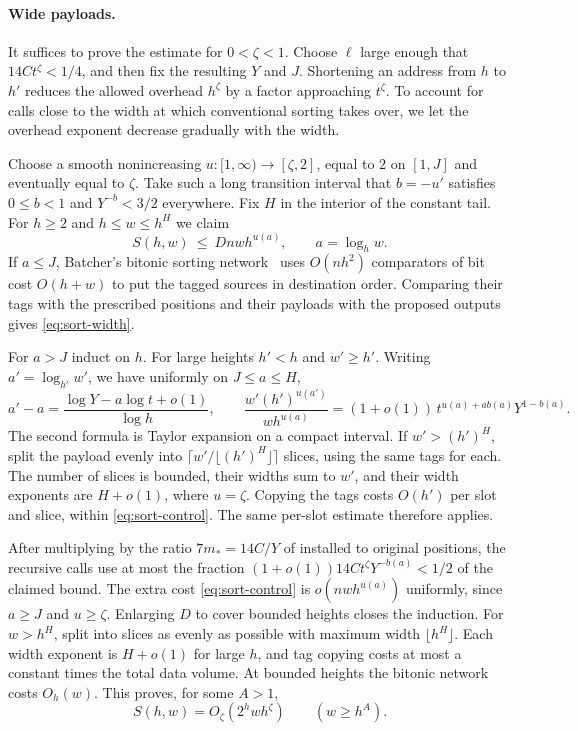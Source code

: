 \paragraph{Wide payloads.}
It suffices to prove the estimate for $0<\zeta<1$.
Choose $\ell$ large enough that $14C t^\zeta<1/4$, and then fix the
resulting $Y$ and $J$. Shortening an address from $h$ to $h'$ reduces
the allowed overhead $h^\zeta$ by a factor approaching $t^\zeta$.
To account for calls close to the width at which conventional sorting
takes over, we let the overhead exponent decrease gradually with the
width.

Choose a smooth nonincreasing $u:[1,\infty)\to[\zeta,2]$, equal to
$2$ on $[1,J]$ and eventually equal to $\zeta$. Take such a long
transition interval that $b=-u'$ satisfies $0\le b<1$ and
$Y^{-b}<3/2$ everywhere. Fix $H$ in the interior of the constant
tail. For $h\ge2$ and $h\le w\le h^H$ we claim
\begin{equation}
       S(h,w)\ \le\ D n w h^{u(a)},\qquad a=\log_h w .
       \label{eq:sort-width}
\end{equation}
If $a\le J$, Batcher's bitonic sorting network~\cite{batcher} uses
$O(nh^2)$ comparators of bit cost $O(h+w)$ to put the tagged sources
in destination order. Comparing their tags with the prescribed
positions and their payloads with the proposed outputs gives
\eqref{eq:sort-width}.

For $a>J$ induct on $h$. For large heights $h'<h$ and $w'\ge h'$.
Writing $a'=\log_{h'}w'$, we have uniformly on $J\le a\le H$,
\[
 a'-a=\frac{\log Y-a\log t+o(1)}{\log h},
 \qquad
 \frac{w'(h')^{u(a')}}{w h^{u(a)}}
   =(1+o(1))\,t^{u(a)+a b(a)}Y^{1-b(a)}.
\]
The second formula is Taylor expansion on a compact interval.
If $w'>(h')^H$, split the payload evenly into
$\lceil w'/\lfloor(h')^H\rfloor\rceil$ slices, using the same tags
for each. The number of slices is bounded, their widths sum to $w'$,
and their width exponents are $H+o(1)$, where $u=\zeta$. Copying
the tags costs $O(h')$ per slot and slice, within
\eqref{eq:sort-control}. The same per-slot estimate therefore applies.

After multiplying by the ratio $7m_*=14C/Y$ of installed to original
positions, the recursive calls use at most the fraction
$(1+o(1))14C t^\zeta Y^{-b(a)}<1/2$ of the claimed bound.
The extra cost \eqref{eq:sort-control} is $o(nwh^{u(a)})$ uniformly,
since $a\ge J$ and $u\ge\zeta$. Enlarging $D$ to cover bounded
heights closes the induction. For $w>h^H$, split into slices as
evenly as possible with maximum width $\lfloor h^H\rfloor$. Each
width exponent is $H+o(1)$ for large $h$, and tag copying costs at
most a constant times the total data volume. At bounded heights the
bitonic network costs $O_h(w)$. This proves, for some $A>1$,
\begin{equation}
         S(h,w)=O_\zeta(2^h w h^\zeta)\qquad(w\ge h^A).
         \label{eq:sort-all-wide}
\end{equation}

